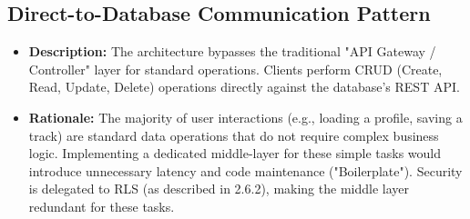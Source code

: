 \subsection{Direct-to-Database Communication Pattern}
\begin{itemize}
    \item \textbf{Description:} The architecture bypasses the traditional "API Gateway / Controller" layer for standard operations. Clients perform CRUD (Create, Read, Update, Delete) operations directly against the database's REST API.
    \item \textbf{Rationale:} The majority of user interactions (e.g., loading a profile, saving a track) are standard data operations that do not require complex business logic. Implementing a dedicated middle-layer for these simple tasks would introduce unnecessary latency and code maintenance ("Boilerplate"). Security is delegated to RLS (as described in 2.6.2), making the middle layer redundant for these tasks.
\end{itemize}
